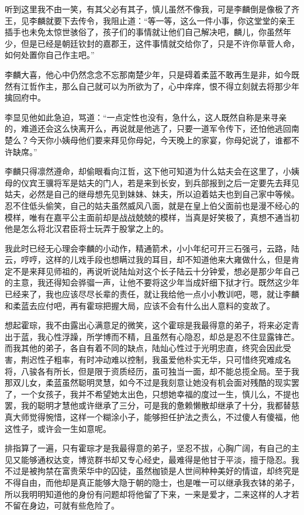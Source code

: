 听到这里我不由一笑，有其父必有其子，慎儿虽然不像我，可是李麟倒是像极了齐王，见李麟就要下去传令，我阻止道：“等一等，这么一件小事，你这堂堂的亲王插手也未免太惊世骇俗了，孩子们的事情就让他们自己解决吧，麟儿，你虽然年少，但是已经是朝廷钦封的嘉郡王，这件事情就交给你了，只是不许你草菅人命，如何处置你自己作主吧。”

李麟大喜，他心中仍然念念不忘那南楚少年，只是碍着柔蓝不敢再生是非，如今既然有江哲作主，那么自己就可以为所欲为了，心中痒痒，恨不得立刻就去将那少年擒回府中。

李显见他如此急迫，骂道：“一点定性也没有，急什么，这人既然自称是来寻亲的，难道还会这么快离开么，再说就是他逃了，只要一道军令传下，还怕他逃回南楚么？今天你小姨母他们要来拜见你母妃，今天晚上的家宴，你母妃说了，谁都不许缺席。”

李麟只得凛然遵命，却偷眼看向江哲，这下他可知道为什么姑夫会在这里了，小姨母的仪宾王骥将军是姑夫的门人，若是来到长安，到兵部报到之后一定要先去拜见姑夫，必然是自己的继母想先见到妹妹、妹夫，所以迫着姑夫也到自己家中等候。忍不住低头偷笑，自己的姑夫虽然威风八面，就是在皇上伯父面前也是漫不经心的模样，唯有在嘉平公主面前却是战战兢兢的模样，当真是好笑极了，真想不通当初他是怎么将北汉君臣将士玩弄于股掌之上的。

我此时已经无心理会李麟的小动作，精通箭术，小小年纪可开三石强弓，云路，陆云，哼哼，这样的儿戏手段也想瞒过我的耳目，却不知道他来大雍做什么，但是肯定不是来拜见师祖的，再说听说陆灿对这个长子陆云十分钟爱，想必是那少年自己的主意，我还得知会骅骝一声，让他不要将这少年当成奸细下狱才行。既然这少年已经来了，我也应该尽尽长辈的责任，就让我给他一点小小教训吧，嗯，就让李麟和柔蓝去应付吧，再有霍琮把握大局，应该不会有什么出人意料的变故了。

想起霍琮，我不由露出心满意足的微笑，这个霍琮是我最得意的弟子，将来必定青出于蓝，我心性浮躁，所学博而不精，且虽然有心隐忍，却总是忍不住显露锋芒。而我其他的弟子，各自有着不同的缺点，陆灿心性过于光明忠直，终究会因此受害，荆迟性子粗率，有时冲动难以控制，我虽爱他朴实无华，只可惜终究难成名将，八骏各有所长，但是限于资质经历，虽可独当一面，却不能总揽全局。至于我那双儿女，柔蓝虽然聪明灵慧，如今不过是我刻意让她没有机会面对残酷的现实罢了，一个女孩子，我并不希望她太出色，只想她幸福的度过一生，慎儿么，不提也罢，我的聪明才慧他或许继承了三分，可是我的惫赖懒散却继承了十分，我都替慈真大师觉得惋惜，这样一个糊涂小子，能够担任护法之责么，不过傻人有傻福，他这性子，或许会一生如意呢。

排指算了一遍，只有霍琮才是我最得意的弟子，坚忍不拔，心胸广阔，有自己的主见又能够通权达变，博览群书却又专心经史，最难得是他甘于平淡，擅于隐忍。我不过是被拘禁在富贵荣华中的囚徒，虽然枷锁是人世间种种美好的情谊，却终究是不得自由，而他却是真正能够大隐于朝的隐士，也是唯一可以继承我衣钵的弟子，所以我明明知道他的身份有问题却将他留了下来，一来是爱才，二来这样的人才若不留在身边，可就有些危险了。

